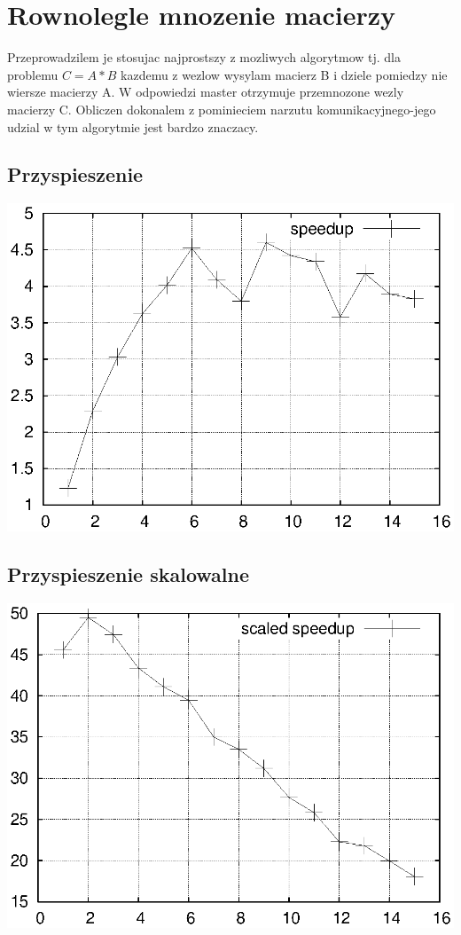 \documentclass{article}
\begin{document}
\section{Rownolegle mnozenie macierzy}

Przeprowadzilem je stosujac najprostszy z mozliwych algorytmow tj. dla problemu
\( C = A*B \)
kazdemu z wezlow wysylam macierz B i dziele pomiedzy nie wiersze macierzy A. W odpowiedzi master otrzymuje przemnozone wezly macierzy C. Obliczen dokonalem z pominieciem narzutu komunikacyjnego-jego udzial w tym algorytmie jest bardzo znaczacy.

\subsection{Przyspieszenie}

\includegraphics{speedup1.eps}

\subsection{Przyspieszenie skalowalne}

\includegraphics{speedup1_sc.eps}
\end{document}
